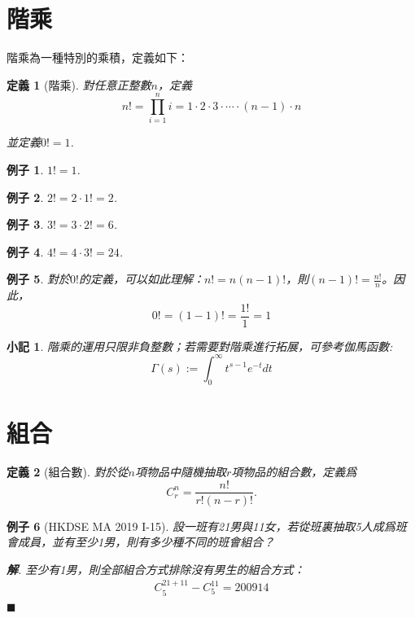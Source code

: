 \documentclass[12pt]{article}
\newtheorem{definition}{定義}
\newtheorem*{remark}{小記}
\newtheorem*{example}{例子}
\newenvironment*{sol}{\par \textbf{解}.}{\hfill$\blacksquare$}
\begin{document}
    \section*{階乘}

    階乘為一種特別的乘積，定義如下：

    \begin{definition}[階乘]
        對任意正整數$n$，定義$$n!=\prod_{i=1}^n i=1\cdot2\cdot3\cdot\cdots\cdot (n-1)\cdot n$$

        並定義$0!=1$.
    \end{definition}

    \begin{example}
        $1!=1$.
    \end{example}

    \begin{example}
        $2!=2\cdot 1!=2$.
    \end{example}

    \begin{example}
        $3!=3\cdot 2!=6$.
    \end{example}

    \begin{example}
        $4!=4\cdot 3!=24$.
    \end{example}

    \begin{example}
        對於$0!$的定義，可以如此理解：$n!=n(n-1)!$，則$(n-1)!=\frac{n!}{n}$。因此，$$0!=(1-1)!=\frac{1!}{1}=1$$
    \end{example}

    \begin{remark}
        階乘的運用只限非負整數；若需要對階乘進行拓展，可參考伽馬函數:$$\Gamma(s):=\int_0^\infty t^{s-1}e^{-t}dt$$
    \end{remark}

    \section*{組合}

    \begin{definition}[組合數]
        對於從$n$項物品中隨機抽取$r$項物品的組合數，定義爲$$C_r^n=\frac{n!}{r!(n-r)!}.$$
    \end{definition}

    \begin{example}[HKDSE MA 2019 I-15]
        設一班有21男與11女，若從班裏抽取5人成爲班會成員，並有至少1男，則有多少種不同的班會組合？
        \begin{sol}
            至少有1男，則全部組合方式排除沒有男生的組合方式：\begin{align*}
                C_5^{21+11}-C_5^{11}=200914
            \end{align*}
        \end{sol}
    \end{example}
\end{document}
